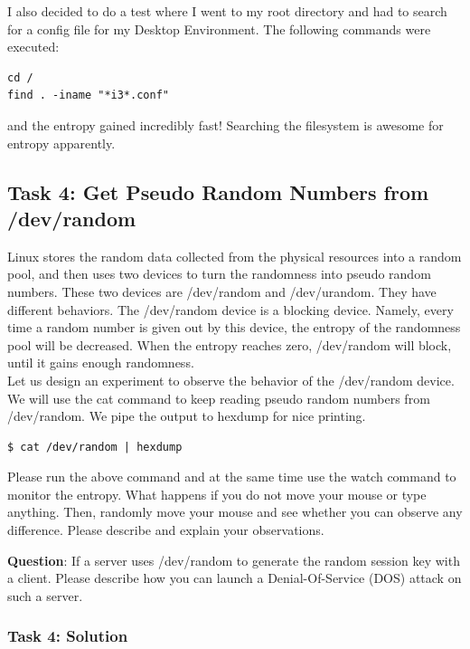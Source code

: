 \documentclass[12pt]{article}
\newcommand\tab[1][0.5cm]{\hspace*{#1}}
\begin{document}
I also decided to do a test where I went to my root directory and had to search for a config file for my Desktop Environment. The following commands were executed:
\begin{verbatim}
cd /
find . -iname "*i3*.conf"
\end{verbatim}
and the entropy gained incredibly fast! Searching the filesystem is awesome for entropy apparently.

\clearpage
\subsection{Task 4: Get Pseudo Random Numbers from /dev/random}
Linux stores the random data collected from the physical resources into a random pool, and then uses
two devices to turn the randomness into pseudo random numbers. These two devices are /dev/random
and /dev/urandom. They have different behaviors. The /dev/random device is a blocking device.
Namely, every time a random number is given out by this device, the entropy of the randomness pool will be
decreased. When the entropy reaches zero, /dev/random will block, until it gains enough randomness. \\
\tab Let us design an experiment to observe the behavior of the /dev/random device. We will use the cat
command to keep reading pseudo random numbers from /dev/random. We pipe the output to hexdump
for nice printing.
\begin{verbatim}
$ cat /dev/random | hexdump
\end{verbatim}
\tab Please run the above command and at the same time use the watch command to monitor the entropy.
What happens if you do not move your mouse or type anything. Then, randomly move your mouse and see
whether you can observe any difference. Please describe and explain your observations.

\textbf{Question}: If a server uses /dev/random to generate the random session key with a client. Please
describe how you can launch a Denial-Of-Service (DOS) attack on such a server.

\subsubsection{Task 4: Solution}
\end{document}
